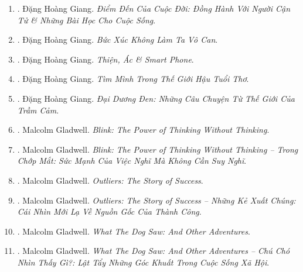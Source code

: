 \documentclass{article}
\begin{document}
\begin{enumerate}
\begin{quotation}
		{\it````He who has a why to live for can bear with almost any how.''''}
		
		-- ''Người có lý do để sống có thể chịu đựng được hầu hết mọi việc.''
	\end{quotation}	
	
	\item \cite{Giang_death}. {\sc Đặng Hoàng Giang}. {\it Điểm Đến Của Cuộc Đời: Đồng Hành Với Người Cận Tử \& Những Bài Học Cho Cuộc Sống}.\hfill{\sf[done]}
	
	\item \cite{Giang_buc_xuc}. {\sc Đặng Hoàng Giang}. {\it Bức Xúc Không Làm Ta Vô Can}.\hfill{\sf[done]}
	
	\item \cite{Giang_smartphone}. {\sc Đặng Hoàng Giang}. {\it Thiện, Ác \& Smart Phone}.\hfill{\sf[done]}
	
	\item \cite{Giang_after_childhood}. {\sc Đặng Hoàng Giang}. {\it Tìm Mình Trong Thế Giới Hậu Tuổi Thơ}.\hfill{\sf[done]}
	
	\item \cite{Giang_dai_duong_den}. {\sc Đặng Hoàng Giang}. {\it Đại Dương Đen: Những Câu Chuyện Từ Thế Giới Của Trầm Cảm}.\hfill{\sf[done]}
	
	\item \cite{Gladwell2007}. Malcolm Gladwell. {\it Blink: The Power of Thinking Without Thinking}.\hfill{\sf[reading]}
	
	\item \cite{Gladwell_blink}. Malcolm Gladwell. {\it Blink: The Power of Thinking Without Thinking -- Trong Chớp Mắt: Sức Mạnh Của Việc Nghĩ Mà Không Cần Suy Nghĩ}.\hfill{\sf[done]}
	
	\item \cite{Gladwell2008}. Malcolm Gladwell. {\it Outliers: The Story of Success}.\hfill{\sf[reading]}
	
	\item \cite{Gladwell_outlier}. Malcolm Gladwell. {\it Outliers: The Story of Success -- Những Kẻ Xuất Chúng: Cái Nhìn Mới Lạ Về Nguồn Gốc Của Thành Công}.\hfill{\sf[done]}
	
	\item \cite{Gladwell2009}. Malcolm Gladwell. {\it What The Dog Saw: And Other Adventures}.\hfill{\sf[reading]}
	
	\item \cite{Gladwell_dog}. Malcolm Gladwell. {\it What The Dog Saw: And Other Adventures -- Chú Chó Nhìn Thấy Gì?: Lật Tẩy Những Góc Khuất Trong Cuộc Sống Xã Hội}.\hfill{\sf[done]}
	

\end{enumerate}
\end{document}
